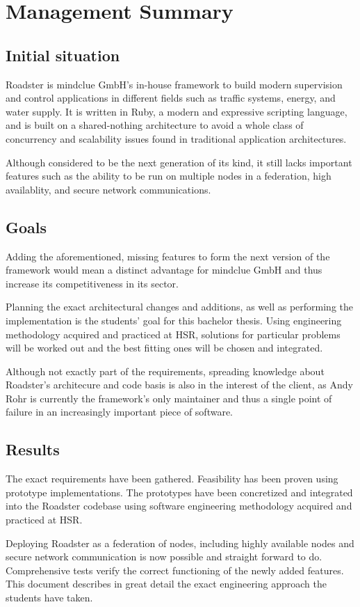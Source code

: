 \part{Management Summary}\label{part:mgmtsummary}
\chapter*{Initial situation}
Roadster is mindclue GmbH's in-house framework to build modern supervision and
control applications in different fields such as traffic systems, energy,
and water supply. It is written in Ruby, a modern and expressive scripting
language, and is built on a shared-nothing architecture to avoid a whole class
of concurrency and scalability issues found in traditional application
architectures.

Although considered to be the next generation of its kind, it still lacks
important features such as the ability to be run on multiple
nodes in a federation, high availablity, and secure network communications.

\chapter*{Goals}
Adding the aforementioned, missing features to form the next version of the
framework would mean a distinct advantage for mindclue GmbH and thus increase
its competitiveness in its sector.

Planning the exact architectural changes and additions, as well as performing
the implementation is the students' goal for this bachelor thesis. Using
engineering methodology acquired and practiced at HSR, solutions for particular problems
will be worked out and the best fitting ones will be chosen and integrated.

Although not exactly part of the requirements, spreading knowledge about Roadster's
architecure and code basis is also in the interest of the client, as Andy Rohr
is currently the framework's only maintainer and thus a single point of failure
in an increasingly important piece of software.

\chapter*{Results}
The exact requirements have been gathered. Feasibility has been proven using
prototype implementations. The prototypes have been concretized and integrated
into the Roadster codebase using software engineering methodology acquired and
practiced at HSR.

Deploying Roadster as a federation of nodes, including highly available nodes
and secure network communication is now possible and straight forward to do.
Comprehensive tests verify the correct functioning of the newly added features.
This document describes in great detail the exact engineering approach the
students have taken.
